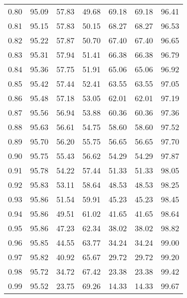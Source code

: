 \begin{tabular}{|c|c|c|c|c|c|c|}
      0.80 &     95.09 &     57.83 &      49.68 &   69.18 &      69.18 &         96.41 \\
      0.81 &     95.15 &     57.83 &      50.15 &   68.27 &      68.27 &         96.53 \\
      0.82 &     95.22 &     57.87 &      50.70 &   67.40 &      67.40 &         96.65 \\
      0.83 &     95.31 &     57.94 &      51.41 &   66.38 &      66.38 &         96.79 \\
      0.84 &     95.36 &     57.75 &      51.91 &   65.06 &      65.06 &         96.92 \\
      0.85 &     95.42 &     57.44 &      52.41 &   63.55 &      63.55 &         97.05 \\
      0.86 &     95.48 &     57.18 &      53.05 &   62.01 &      62.01 &         97.19 \\
      0.87 &     95.56 &     56.94 &      53.88 &   60.36 &      60.36 &         97.36 \\
      0.88 &     95.63 &     56.61 &      54.75 &   58.60 &      58.60 &         97.52 \\
      0.89 &     95.70 &     56.20 &      55.75 &   56.65 &      56.65 &         97.70 \\
      0.90 &     95.75 &     55.43 &      56.62 &   54.29 &      54.29 &         97.87 \\
      0.91 &     95.78 &     54.22 &      57.44 &   51.33 &      51.33 &         98.05 \\
      0.92 &     95.83 &     53.11 &      58.64 &   48.53 &      48.53 &         98.25 \\
      0.93 &     95.86 &     51.54 &      59.91 &   45.23 &      45.23 &         98.45 \\
      0.94 &     95.86 &     49.51 &      61.02 &   41.65 &      41.65 &         98.64 \\
      0.95 &     95.86 &     47.23 &      62.34 &   38.02 &      38.02 &         98.82 \\
      0.96 &     95.85 &     44.55 &      63.77 &   34.24 &      34.24 &         99.00 \\
      0.97 &     95.82 &     40.92 &      65.67 &   29.72 &      29.72 &         99.20 \\
      0.98 &     95.72 &     34.72 &      67.42 &   23.38 &      23.38 &         99.42 \\
      0.99 &     95.52 &     23.75 &      69.26 &   14.33 &      14.33 &         99.67 \\
\bottomrule
\end{tabular}
